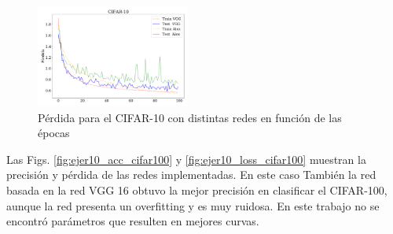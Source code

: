 \begin{figure}[H]
    \begin{small}
        \begin{center}
            \includegraphics[width=0.45\textwidth]{Graphs/ejer10_loss_cifar10.pdf}
        \end{center}
        \caption{Pérdida para el CIFAR-10 con distintas redes en función de las épocas}
        \label{fig:ejer10_loss_cifar10}
    \end{small}
\end{figure}

Las Figs. \ref{fig:ejer10_acc_cifar100} y \ref{fig:ejer10_loss_cifar100} muestran la precisión y pérdida de las redes implementadas. En este caso También la red basada en la red VGG 16 obtuvo la mejor precisión en clasificar el CIFAR-100, aunque la red presenta un overfitting y es muy ruidosa. En este trabajo no se encontró parámetros que resulten en mejores curvas.


